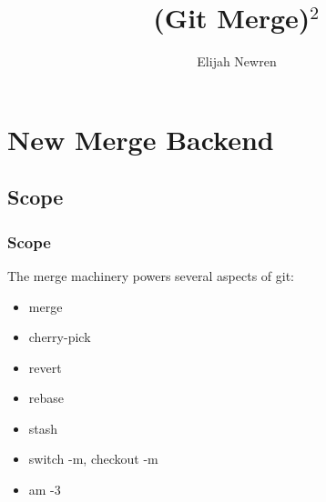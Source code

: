 \documentclass[compress,t]{beamer}
\title{(Git Merge)$^2$}
\author{Elijah Newren}
\institute{Palantir Technologies}
\date{}
\begin{document}

\begin{frame}
  \titlepage
\end{frame}

\section{New Merge Backend}
\subsection{Scope}

\begin{frame}
  \frametitle{Scope}

  The merge machinery powers several aspects of git:

  \begin{itemize}
    \item merge
    \item cherry-pick
    \item revert
    \item rebase
    \item stash
    \item switch -m, checkout -m
    \item am -3
  \end{itemize}


\end{frame}
\end{document}
